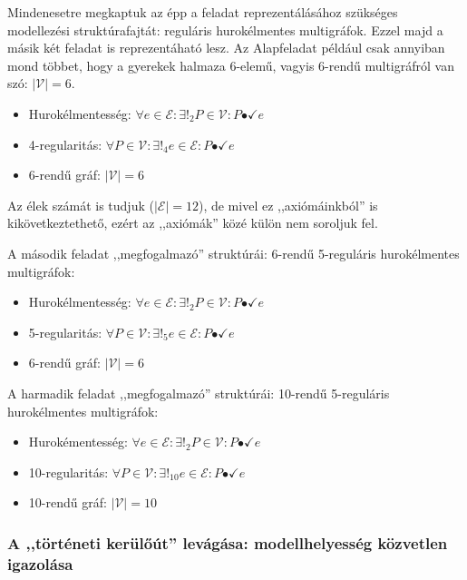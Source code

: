 \documentclass{article}
\newcommand{\incidsymbol}{\bullet\!\!\!\checkmark}
\newcommand{\incid}{\mathrel{\incidsymbol}} %
\begin{document}
	Mindenesetre megkaptuk az épp a feladat reprezentálásához szükséges modellezési struktúrafajtát: reguláris hurokélmentes multigráfok. Ezzel majd a másik két feladat is reprezentáható lesz. Az Alapfeladat például csak annyiban mond többet, hogy a gyerekek halmaza 6-elemű, vagyis 6-rendű multigráfról van szó: $\left|\mathcal V\right| = 6$.

	\begin{itemize}
		\item
		Hurokélmentesség: $\forall e \in \mathcal E: \exists!_2 P \in \mathcal V: P \incid e$ 
		\item
		4-regularitás: $\forall P \in \mathcal V: \exists!_4 e \in \mathcal E: P  \incid e$
		\item
		6-rendű gráf: $\left|\mathcal V\right| = 6$
	\end{itemize}

	Az élek számát is tudjuk ($\left|\mathcal E\right| = 12$), de mivel ez ,,axiómáinkból'' is kikövetkeztethető, ezért az ,,axiómák'' közé külön nem soroljuk fel.

	A második feladat ,,megfogalmazó'' struktúrái: 6-rendű 5-reguláris hurokélmentes multigráfok:
	\begin{itemize}
		\item
		Hurokélmentesség: $\forall e \in \mathcal E: \exists!_2 P \in \mathcal V: P \incid e$
		\item
		5-regularitás: $\forall P \in \mathcal V: \exists!_5 e \in \mathcal E: P  \incid e$
		\item
		6-rendű gráf: $\left|\mathcal V\right| = 6$
	\end{itemize}


	A harmadik feladat ,,megfogalmazó'' struktúrái: 10-rendű 5-reguláris hurokélmentes multigráfok:
	\begin{itemize}
		\item
		Hurokémentesség: $\forall e \in \mathcal E: \exists!_2 P \in \mathcal V: P \incid e$
		\item
		10-regularitás: $\forall P \in \mathcal V: \exists!_{10} e \in \mathcal E: P  \incid e$
		\item
		10-rendű gráf: $\left|\mathcal V\right| = 10$
	\end{itemize}


	\subsubsection{A ,,történeti kerülőút'' levágása: modellhelyesség közvetlen igazolása}
\end{document}
